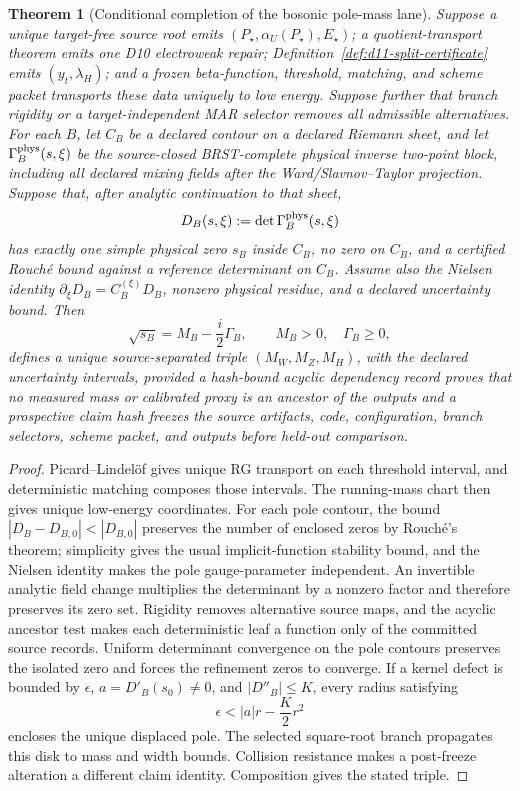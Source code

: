 \documentclass[11pt]{article}
\newtheorem{theorem}{Theorem}[section]
\begin{document}
\begin{theorem}[Conditional completion of the bosonic pole-mass
lane]\label{thm:conditional-boson-pole-completion}
Suppose a unique target-free source root emits
\((P_\star,\alpha_U(P_\star),E_\star)\); a quotient-transport theorem emits one
D10 electroweak repair; Definition~\ref{def:d11-split-certificate} emits
\((y_t,\lambda_H)\); and a frozen beta-function, threshold, matching, and
scheme packet transports these data uniquely to low energy.  Suppose further
that branch rigidity or a target-independent MAR selector removes all
admissible alternatives.  For each \(B\), let \(C_B\) be a declared contour
on a declared Riemann sheet, and let \(\Gamma_B^{\rm phys}(s,\xi)\) be the
source-closed BRST-complete physical inverse two-point block, including all
declared mixing fields after the Ward/Slavnov--Taylor projection.  Suppose
that, after analytic continuation to that sheet,
\[
D_B(s,\xi):=\det\Gamma_B^{\rm phys}(s,\xi)
\]
has exactly one simple physical zero \(s_B\) inside \(C_B\), no zero on
\(C_B\), and a certified Rouch\'e bound against a reference determinant on
\(C_B\).  Assume also the Nielsen identity
\(\partial_\xi D_B=C_B^{(\xi)}D_B\), nonzero physical residue, and a declared
uncertainty bound.  Then
\[
\sqrt{s_B}=M_B-\frac i2\Gamma_B,
\qquad M_B>0,\quad \Gamma_B\ge0,
\]
defines a unique source-separated triple \((M_W,M_Z,M_H)\), with the declared
uncertainty intervals, provided a hash-bound acyclic dependency record proves
that no measured mass or calibrated proxy is an ancestor of the outputs and a
prospective claim hash freezes the source artifacts, code, configuration,
branch selectors, scheme packet, and outputs before held-out comparison.
\end{theorem}

\begin{proof}
Picard--Lindel\"of gives unique RG transport on each threshold interval, and
deterministic matching composes those intervals.  The running-mass chart then
gives unique low-energy coordinates.  For each pole contour, the bound
\(|D_B-D_{B,0}|<|D_{B,0}|\) preserves the number of enclosed zeros by
Rouch\'e's theorem; simplicity gives the usual implicit-function stability
bound, and the Nielsen identity makes the pole gauge-parameter independent.
An invertible analytic field change multiplies the determinant by a nonzero
factor and therefore preserves its zero set.  Rigidity removes alternative source maps, and the acyclic
ancestor test makes each deterministic leaf a function only of the committed
source records. Uniform determinant convergence on the pole contours preserves
the isolated zero and forces the refinement zeros to converge. If a kernel
defect is bounded by \(\epsilon\), \(a=D'_B(s_0)\ne0\), and
\(|D''_B|\le K\), every radius satisfying
\[
 \epsilon<|a|r-\frac K2r^2
\]
encloses the unique displaced pole. The selected square-root branch propagates
this disk to mass and width bounds. Collision resistance makes a post-freeze
alteration a different claim identity. Composition gives the stated triple.
\end{proof}
\end{document}
